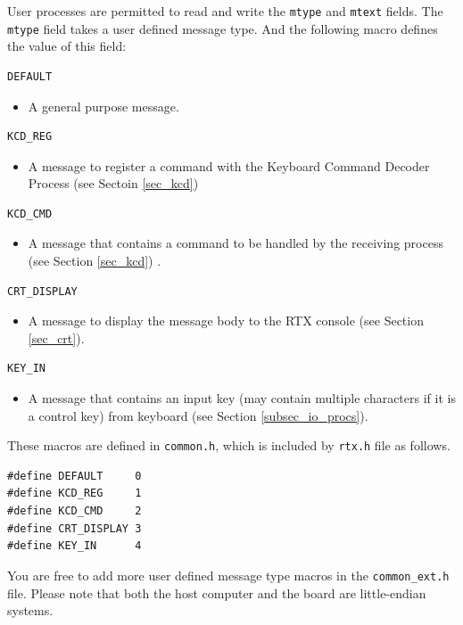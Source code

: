 \begin{itemize}
      User processes are permitted to read and write the \verb+mtype+ and \verb+mtext+ fields. The \verb+mtype+ field takes a user defined message type. And the following macro defines the value of this field:
\begin{verbatim}
DEFAULT
\end{verbatim}
\begin{itemize}
\item[] A general purpose message.
\end{itemize}
\begin{verbatim}
KCD_REG
\end{verbatim}
\begin{itemize}
\item[] A message to register a command with the Keyboard Command Decoder Process (see Sectoin \ref{sec_kcd})
\end{itemize}
\begin{verbatim}
KCD_CMD
\end{verbatim}
\begin{itemize}
\item[] A message that contains a command to be handled by the receiving process (see Section \ref{sec_kcd}) .
\end{itemize}
\begin{verbatim}
CRT_DISPLAY
\end{verbatim}
\begin{itemize}
\item[] A message to display the message body to the RTX console (see Section \ref{sec_crt}).
\end{itemize}
\begin{verbatim}
KEY_IN
\end{verbatim}
\begin{itemize}
\item[] A message that contains an input key (may contain multiple characters if it is a control key) from keyboard (see Section \ref{subsec_io_procs}). 
\end{itemize}
These macros are defined in \verb+common.h+, which is included by \verb+rtx.h+ file as follows.
\begin{lstlisting}
#define DEFAULT     0
#define KCD_REG     1
#define KCD_CMD     2
#define CRT_DISPLAY 3
#define KEY_IN      4
\end{lstlisting}
You are free to add more user defined message type macros in the \verb+common_ext.h+ file.
Please note that both the host computer and the board are little-endian systems.


\end{itemize}
